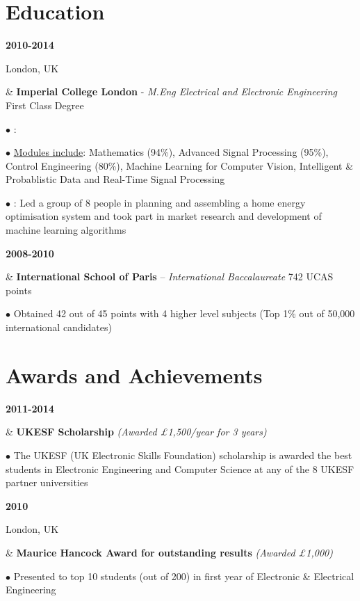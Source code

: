 \documentclass[a4paper,10pt,oneside]{article}
\begin{document}
\section*{Education}
\begin{body}

{\textbf{2010-2014} \par London, UK} & \textbf{Imperial College London} - \textit{M.Eng Electrical and Electronic Engineering} \hfill First Class Degree 



$\bullet$ \underline{}: 

$\bullet$ \underline{Modules include}: Mathematics (94\%), Advanced Signal Processing (95\%), Control Engineering (80\%), Machine Learning for Computer Vision, Intelligent \& Probablistic Data and Real-Time Signal Processing



$\bullet$ \underline{}: Led a group of 8 people in planning and assembling a home energy optimisation system and took part in market research and development of machine learning algorithms
\\ 
{\textbf{2008-2010} \par {} } & \textbf{International School of Paris} – \textit{International Baccalaureate} \hfill 742 UCAS points

$\bullet$ Obtained 42 out of 45 points with 4 higher level subjects (Top 1\% out of 50,000 international candidates)

\end{body}

\section*{Awards and Achievements}

\begin{body}
{\textbf{2011-2014} \par {}} & \textbf{UKESF Scholarship} \textit{(Awarded £1,500/year for 3 years)}

$\bullet$ The UKESF (UK Electronic Skills Foundation) scholarship is awarded the best students in Electronic Engineering and Computer Science at any of the 8 UKESF partner universities
\\
{\textbf{2010} \par London, UK} & \textbf{Maurice Hancock Award for outstanding results} \textit{(Awarded £1,000)}

$\bullet$ Presented to top 10 students (out of 200) in first year of Electronic \& Electrical Engineering

\end{body}
\end{document}
